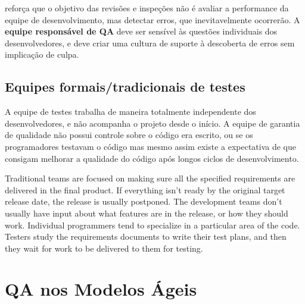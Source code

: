 \documentclass[
	12pt,				%
	openright,			%
	oneside,			%
	a4paper,			%
	english,			%
	brazil,				%
	]{abntex2}
\begin{document}


 reforça que o objetivo das revisões e inspeções não é avaliar a performance da equipe de desenvolvimento, mas detectar erros, que inevitavelmente ocorrerão. A \textbf{equipe responsável de QA} deve ser sensível às questões individuais dos desenvolvedores, e deve criar uma cultura de suporte à descoberta de erros sem implicação de culpa.

\subsection{Equipes formais/tradicionais de testes}
A equipe de testes trabalha de maneira totalmente independente dos desenvolvedores, e não acompanha o projeto desde o início. A equipe de garantia de qualidade não possui controle sobre o código era escrito, ou se os programadores testavam o código mas mesmo assim existe a expectativa de que consigam melhorar a qualidade do código após longos ciclos de desenvolvimento.

Traditional teams are focused on making sure all the specified requirements are delivered in the final product. If everything isn’t ready by the original target release date, the release is usually postponed. The development teams don’t usually have input about what features are in the release, or how they should work. Individual programmers tend to specialize in a particular area of the code. Testers study the requirements documents to write their test plans, and then they wait for work to be delivered to them for testing.

\section{QA nos Modelos Ágeis}
\end{document}
